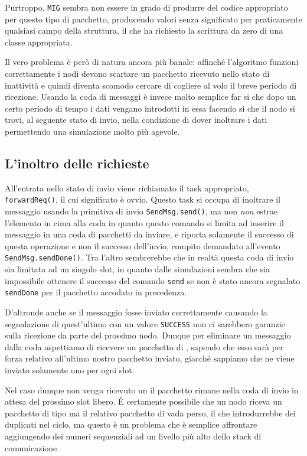 \documentclass[twoside,11pt,a4paper,italian,openany]{book}
\begin{document}
Purtroppo, \texttt{MIG} sembra non essere in grado di produrre del codice appropriato per questo tipo di pacchetto, producendo valori senza significato per praticamente qualsiasi 
campo della struttura, il che ha richiesto la scrittura da zero di una classe appropriata. 
 

Il vero problema è però di natura ancora più banale: affinché l'algoritmo funzioni correttamente 
i nodi devono scartare un pacchetto ricevuto nello stato di inattività e quindi diventa scomodo
cercare di cogliere al volo il breve periodo di ricezione. 
Usando la coda di messaggi è invece molto semplice far si che dopo un certo periodo di tempo 
i dati vengano introdotti in essa facendo si che il nodo si trovi, al seguente stato di invio, 
nella condizione di dover inoltrare i dati permettendo una simulazione molto più agevole. 


\subsection{L'inoltro delle richieste}
All'entrata nello stato di invio viene richiamato il task appropriato, 
\texttt{forwardReq()}, il cui significato è ovvio.
Questo task si occupa di inoltrare il messaggio usando la primitiva di invio 
\texttt{SendMsg.send()},
ma non \emph{non} estrae l'elemento in cima alla coda in quanto questo comando si limita 
ad inserire il messaggio in una coda di pacchetti da inviare, 
e riporta solamente il successo di questa operazione 
e non il successo dell'invio, compito demandato all'evento \texttt{SendMsg.sendDone()}.
Tra l'altro sembrerebbe che in realtà questa coda di invio sia limitata ad un singolo slot, 
in quanto dalle simulazioni sembra che sia impossibile ottenere il successo del comando \texttt{send} se non è stato ancora segnalato \texttt{sendDone} per il pacchetto accodato in precedenza. 


D'altronde anche se il messaggio fosse inviato correttamente causando la segnalazione di 
quest'ultimo con un valore \texttt{SUCCESS}  non ci sarebbero garanzie sulla ricezione da 
parte del prossimo nodo. Dunque per eliminare un messaggio dalla coda aspettiamo di ricevere 
un pacchetto di \ack, sapendo che esso sarà per forza relativo all'ultimo nostro pacchetto 
inviato, giacché sappiamo che ne viene inviato solamente uno per ogni slot. 

Nel caso dunque non venga ricevuto un \ack il pacchetto rimane nella coda di invio in attesa 
del prossimo slot libero. \`E certamente possibile che un nodo riceva un pacchetto di tipo \req 
ma il relativo pacchetto di \ack vada perso, il che introdurrebbe dei duplicati nel ciclo, 
ma questo è un problema che è semplice affrontare aggiungendo dei numeri sequenziali ad un 
livello più alto dello stack di comunicazione. 
\end{document}
